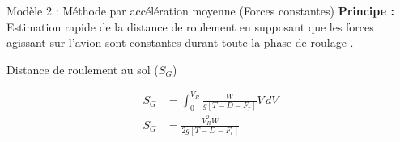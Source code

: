 		
		
		
		
		
		
		
		
		
		
		
		
		
		
		
		
		
		
		
		

		
	
		
		\begin{frame}{Modèle 2 : Méthode par accélération moyenne (Forces constantes)}
			\textbf{Principe :} Estimation rapide de la distance de roulement en supposant que les forces agissant sur l'avion sont constantes durant toute la phase de roulage .
			\vspace*{0.5cm}
			\begin{block}{Distance de roulement au sol ($S_G$)}
						
				
					\begin{align*}
				S_G &= \int_{0}^{V_R} \frac{W}{g[T - D - F_r]} V \, dV \\
				S_G &= \frac{V_R^2 W}{2g [T - D - F_r]}
			\end{align*}
			
			
				
			\end{block}
			
			\vspace*{0.5cm}
			
		
			
			
		
		\end{frame}
			
